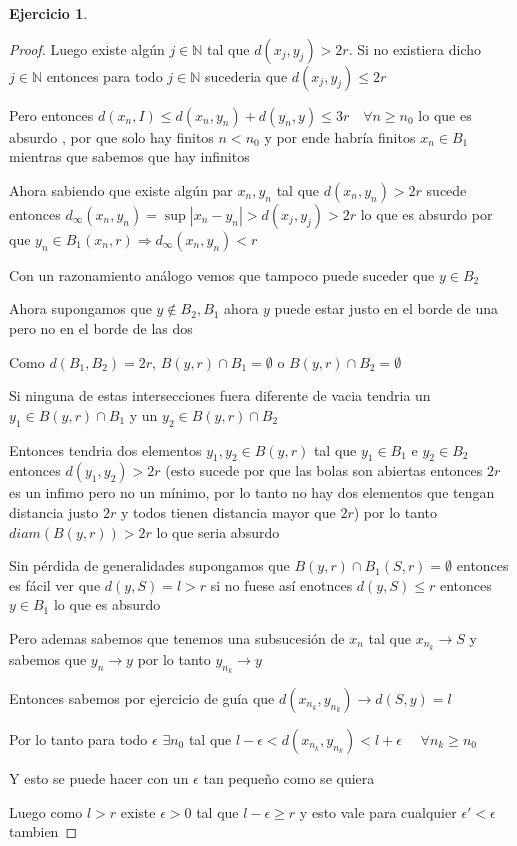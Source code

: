 \documentclass[12pt]{article}
\newcommand{\N}{\mathbb{N}}
\newcommand{\Ra}{\Rightarrow}
\newcommand{\ra}{\rightarrow}
\theoremstyle{definition}
\newtheorem{ej}{Ejercicio}
\begin{document}
\begin{ej}
\begin{proof}
	  Luego existe algún $j \in \N$ tal que $d(x_j,y_j) > 2r$. Si no existiera dicho $j \in \N$ entonces para todo $j \in \N$ sucederia que $d(x_j,y_j) \leq 2r$

	  Pero entonces $d(x_n,I) \leq d(x_n,y_n) + d(y_n,y) \leq 3r \quad \forall n \geq n_0$ lo que es absurdo , por que solo hay finitos $n < n_0$ y por ende habría finitos $x_n \in B_1$ mientras que sabemos que hay infinitos 

	  Ahora sabiendo que existe algún par $x_n,y_n$ tal que $d(x_n,y_n) > 2r$ sucede entonces $d_{\infty}(x_n,y_n) = \sup{|x_n - y_n|}> d(x_j , y_j) > 2r$ lo que es absurdo por que $y_n \in B_1(x_n,r) \Ra d_{\infty}(x_n,y_n) < r$ 

    Con un razonamiento análogo vemos que tampoco puede suceder que $y \in B_2$
 
    Ahora supongamos que $y \notin B_2,B_1$ ahora $y$ puede estar justo en el borde de una pero no en el borde de las dos

    Como $d(B_1,B_2) = 2r$, $B(y,r) \cap B_1 = \emptyset$ o $B(y,r) \cap B_2 = \emptyset$ 

    Si ninguna de estas intersecciones fuera diferente de vacia tendria un $y_1 \in B(y,r) \cap B_1$ y un $y_2 \in B(y,r) \cap B_2$

	  Entonces tendria dos elementos $y_1,y_2 \in B(y,r)$ tal que $y_1 \in B_1$ e $y_2 \in B_2$ entonces $d(y_1,y_2) > 2r$ (esto sucede por que las bolas son abiertas entonces $2r$ es un infimo pero no un mínimo, por lo tanto no hay dos elementos que tengan distancia justo $2r$ y todos tienen distancia mayor que $2r$) por lo tanto $diam (B(y,r)) > 2r$ lo que seria absurdo  

    Sin pérdida de generalidades supongamos que $B(y,r) \cap B_1(S,r) = \emptyset$ entonces es fácil ver que $d(y,S) = l > r$ si no fuese así enotnces $d(y,S) \leq r$ entonces $y \in B_1$ lo que es absurdo

    Pero ademas sabemos que tenemos una subsucesión de $x_n$ tal que $x_{n_k} \ra S$ y sabemos que $y_n \ra y$ por lo tanto $y_{n_k} \ra y$

  Entonces sabemos por ejercicio de guía que $d(x_{n_k},y_{n_k}) \ra d(S,y) = l$

  Por lo tanto para todo $\epsilon $ $\exists n_0$ tal que $l - \epsilon < d(x_{n_k},y_{n_k}) < l + \epsilon \quad $ $\forall n_k \geq n_0$ 

  Y esto se puede hacer con un $\epsilon$ tan pequeño como se quiera

    Luego como $l > r $ existe $\epsilon > 0$ tal que $l-\epsilon \geq r$ y esto vale para cualquier $\epsilon ' < \epsilon$ tambien


\end{proof}
\end{ej}
\end{document}
